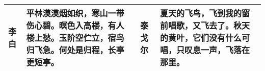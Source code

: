 \centering
\begin{tabularx}{350pt}{lXlX}
  \toprule
  李白 & 平林漠漠烟如织，寒山一带伤心碧。暝色入高楼，有人楼上愁。玉阶空伫立，宿鸟归飞急。何处是归程，长亭更短亭。& 
  泰戈尔 & 夏天的飞鸟，飞到我的窗前唱歌，又飞去了。秋天的黄叶，它们没有什么可唱，只叹息一声，飞落在那里。\\
  \bottomrule
\end{tabularx}
